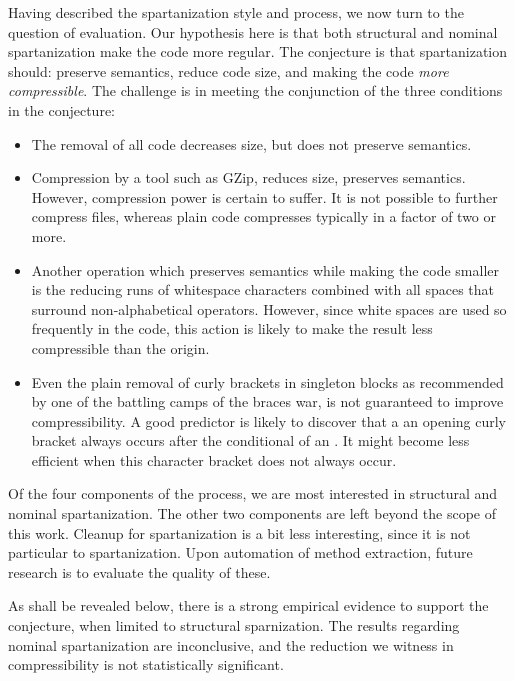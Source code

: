 
Having described the spartanization style and process, we now turn to the
question of evaluation.  Our hypothesis here is that both structural and
nominal spartanization make the code more regular. The conjecture is that
spartanization should: preserve semantics, reduce code size, and making the
code \emph{more compressible}. The challenge is in meeting the conjunction of
the three conditions in the conjecture:
\begin{itemize}
    \item The removal of all code decreases size, but does not preserve semantics.
    \item Compression by a tool such as GZip, reduces size, preserves
      semantics. However, compression power is certain to suffer. It is 
      not possible to further compress  files, whereas plain code
      compresses typically in a factor of two or more.
    \item Another operation which preserves semantics while making
      the code smaller is the reducing runs of whitespace characters combined 
      with all spaces that surround non-alphabetical operators. 
      However, since white spaces are used so frequently in the code,
      this action is likely to make the result less compressible than the origin. 
    \item Even the plain removal of curly brackets in singleton blocks as
      recommended by one of the battling camps of the braces war, is not guaranteed
      to improve compressibility. A good predictor is likely to discover that a
      an opening curly bracket always occurs after the conditional of an . 
      It might become less efficient when this character bracket does not always occur. 
\end{itemize}

Of the four components of the process, we are most interested in structural and
nominal spartanization. The other two components are left beyond the scope of
this work.  Cleanup for spartanization is a bit less interesting, since it is
not particular to spartanization.  Upon automation of method extraction, future
research is to evaluate the quality of these. 

As shall be revealed below, there is a strong empirical evidence to support
the conjecture, when limited to structural sparnization. The results regarding
nominal spartanization are inconclusive, and the reduction we witness in 
compressibility is not statistically significant. 


